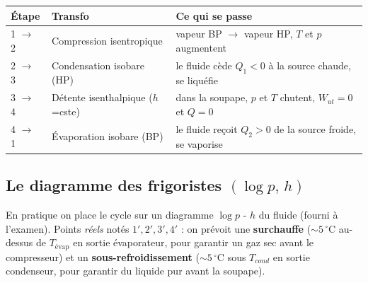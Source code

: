 \begin{center}
\renewcommand{\arraystretch}{1.5}
\begin{tabularx}{\linewidth}{@{}l l X@{}}
\toprule
\textbf{Étape} & \textbf{Transfo} & \textbf{Ce qui se passe} \\
\midrule
1 $\to$ 2 & Compression isentropique & vapeur BP $\to$ vapeur HP, $T$ et $p$ augmentent \\
2 $\to$ 3 & Condensation isobare (HP) & le fluide cède $Q_1<0$ à la source chaude, se liquéfie \\
3 $\to$ 4 & Détente isenthalpique ($h$=cste) & dans la soupape, $p$ et $T$ chutent, $W_{ut}=0$ et $Q=0$ \\
4 $\to$ 1 & Évaporation isobare (BP) & le fluide reçoit $Q_2>0$ de la source froide, se vaporise \\
\bottomrule
\end{tabularx}
\end{center}

\subsection{Le diagramme des frigoristes $(\log p,\,h)$}

En pratique on place le cycle sur un diagramme $\log p$ - $h$ du fluide (fourni à l'examen). Points \emph{réels}
notés $1',2',3',4'$ : on prévoit une \textbf{surchauffe} ($\sim5\,^\circ$C au-dessus de $T_{\text{évap}}$ en sortie
évaporateur, pour garantir un gaz sec avant le compresseur) et un \textbf{sous-refroidissement}
($\sim5\,^\circ$C sous $T_{cond}$ en sortie condenseur, pour garantir du liquide pur avant la soupape).

\begin{center}
\end{center}

